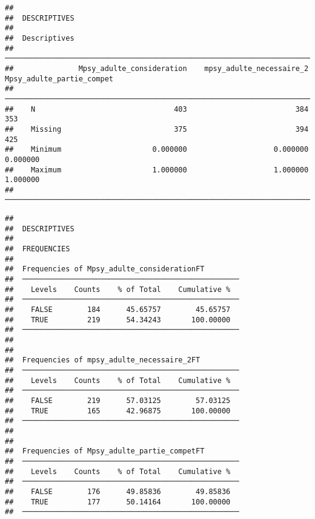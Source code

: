 \documentclass[
]{article}
\begin{document}
\begin{verbatim}
## 
##  DESCRIPTIVES
## 
##  Descriptives                                                                                      
##  ───────────────────────────────────────────────────────────────────────────────────────────────── 
##               Mpsy_adulte_consideration    mpsy_adulte_necessaire_2    Mpsy_adulte_partie_compet   
##  ───────────────────────────────────────────────────────────────────────────────────────────────── 
##    N                                403                         384                          353   
##    Missing                          375                         394                          425   
##    Minimum                     0.000000                    0.000000                     0.000000   
##    Maximum                     1.000000                    1.000000                     1.000000   
##  ─────────────────────────────────────────────────────────────────────────────────────────────────
\end{verbatim}

\begin{verbatim}
## 
##  DESCRIPTIVES
## 
##  FREQUENCIES
## 
##  Frequencies of Mpsy_adulte_considerationFT         
##  ────────────────────────────────────────────────── 
##    Levels    Counts    % of Total    Cumulative %   
##  ────────────────────────────────────────────────── 
##    FALSE        184      45.65757        45.65757   
##    TRUE         219      54.34243       100.00000   
##  ────────────────────────────────────────────────── 
## 
## 
##  Frequencies of mpsy_adulte_necessaire_2FT          
##  ────────────────────────────────────────────────── 
##    Levels    Counts    % of Total    Cumulative %   
##  ────────────────────────────────────────────────── 
##    FALSE        219      57.03125        57.03125   
##    TRUE         165      42.96875       100.00000   
##  ────────────────────────────────────────────────── 
## 
## 
##  Frequencies of Mpsy_adulte_partie_competFT         
##  ────────────────────────────────────────────────── 
##    Levels    Counts    % of Total    Cumulative %   
##  ────────────────────────────────────────────────── 
##    FALSE        176      49.85836        49.85836   
##    TRUE         177      50.14164       100.00000   
##  ──────────────────────────────────────────────────
\end{verbatim}
\end{document}
